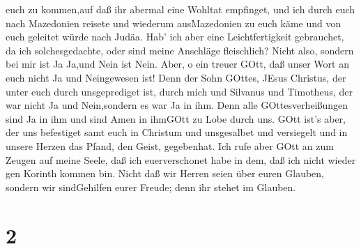 euch zu kommen,auf daß ihr abermal eine Wohltat empfinget, 
und ich durch euch nach Mazedonien reisete und wiederum ausMazedonien zu
euch käme und von euch geleitet würde nach Judäa.  Hab' ich
aber eine Leichtfertigkeit gebrauchet, da ich solchesgedachte, oder sind
meine Anschläge fleischlich? Nicht also, sondern bei mir ist Ja Ja,und
Nein ist Nein.  Aber, o ein treuer GOtt, daß unser Wort an
euch nicht Ja und Neingewesen ist!  Denn der Sohn GOttes,
JEsus Christus, der unter euch durch unsgeprediget ist, durch mich und
Silvanus und Timotheus, der war nicht Ja und Nein,sondern es war Ja in
ihm.  Denn alle GOttesverheißungen sind Ja in ihm und sind
Amen in ihmGOtt zu Lobe durch uns.  GOtt ist's aber, der
uns befestiget samt euch in Christum und unsgesalbet  und
versiegelt und in unsere Herzen das Pfand, den Geist, gegebenhat.
 Ich rufe aber GOtt an zum Zeugen auf meine Seele, daß ich
euerverschonet habe in dem, daß ich nicht wieder gen Korinth kommen bin.
 Nicht daß wir Herren seien über euren Glauben, sondern wir
sindGehilfen eurer Freude; denn ihr stehet im Glauben.

\hypertarget{section-1}{%
\section{2}\label{section-1}}

